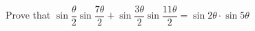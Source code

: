 
%
%
%
%
% 
% 

\question[3] Prove that $\sin\dfrac{\theta}{2}\sin\dfrac{7\theta}{2} + 
\sin\dfrac{3\theta}{2}\sin\dfrac{11\theta}{2} = \sin 2\theta\cdot\sin 5\theta$


\ifprintanswers
\fi 

